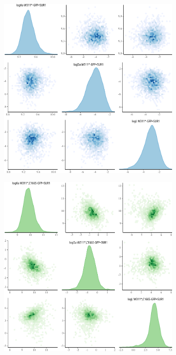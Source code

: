 \begin{figure}[h]
	\begin{subfigure}[t]{0.3\textwidth}
		\caption{}\label{apxfig:inhib_cc_1}
		\centering
		\includegraphics[width=\textwidth]{inhibition_crosscorr_1.pdf}
	\end{subfigure}
	\hfill
	\begin{subfigure}[t]{0.3\textwidth}
		\caption{}\label{apxfig:inhib_cc_2}
		\centering
		\includegraphics[width=\textwidth]{inhibition_crosscorr_2.pdf}

\end{subfigure}
\end{figure}
